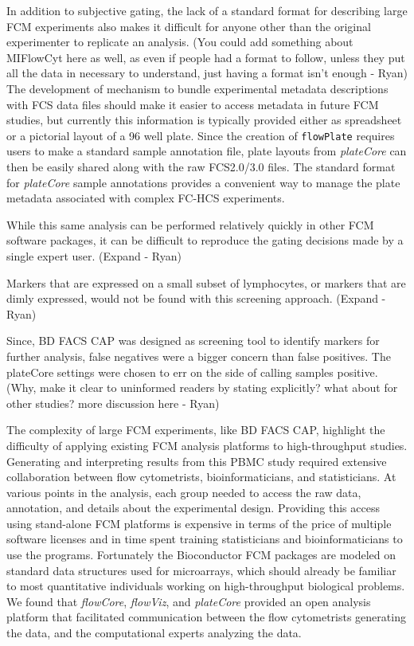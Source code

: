 \documentclass[12pt]{article}
\newcommand{\Robject}[1]{{\texttt{#1}}}
\newcommand{\Rpackage}[1]{{\textit{#1}}}
\begin{document}
In addition to subjective gating, the lack of a standard format for describing
large FCM experiments also makes it difficult for anyone other than the
original experimenter to replicate an analysis. (You could add something about
MIFlowCyt here as well, as even if people had a format to follow, unless they
put all the data in necessary to understand, just having a format isn't enough
- Ryan) The development of mechanism to bundle experimental metadata
descriptions with FCS data files should make it easier to access metadata in
future FCM studies, but currently this information is typically provided either
as spreadsheet or a pictorial layout of a 96 well plate. Since the creation of
\Robject{flowPlate} requires users to make a standard sample annotation file,
plate layouts from \Rpackage{plateCore} can then be easily shared along with
the raw FCS2.0/3.0 files. The standard format for \Rpackage{plateCore} sample
annotations provides a convenient way to manage the plate metadata associated
with complex FC-HCS experiments.

While this same analysis can be performed relatively quickly in 
other FCM software packages, it can be difficult to reproduce the gating
decisions made by a single expert user. (Expand - Ryan)

Markers that are expressed on a small subset of lymphocytes, or markers that
are dimly expressed, would not be found with this screening approach.
(Expand - Ryan)

Since, BD FACS CAP was designed as screening tool to 
identify markers for further analysis, false negatives were a bigger concern
than false positives. The plateCore settings were chosen to err on the side of
calling samples positive. (Why, make it clear to uninformed readers by stating
explicitly? what about for other studies? more discussion here - Ryan)

The complexity of large FCM experiments, like BD FACS CAP, highlight the 
difficulty of applying existing FCM analysis platforms to high-throughput
studies. Generating and interpreting results from this PBMC study required
extensive collaboration between flow cytometrists, bioinformaticians, and
statisticians. At various points in the analysis, each group needed to access
the raw data, annotation, and details about the experimental design. Providing
this access using stand-alone FCM platforms is expensive in terms of the price
of multiple software licenses and in time spent training statisticians and
bioinformaticians to use the programs. Fortunately the Bioconductor FCM
packages are modeled on standard data structures used for microarrays, which
should already be familiar to most quantitative individuals working on
high-throughput biological problems. We found that \Rpackage{flowCore},
\Rpackage{flowViz}, and \Rpackage{plateCore} provided an open analysis platform
that facilitated communication between the flow cytometrists generating the
data, and the computational experts analyzing the data.


\clearpage

 
\end{document}
